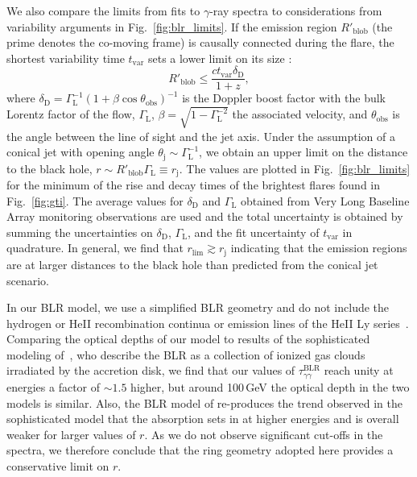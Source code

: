 \documentclass[twocolumn,linenumbers]{aastex62}
\newcommand{\gray}{$\gamma$-ray\xspace}
\begin{document}
We also compare the limits from fits to \gray spectra to considerations from variability arguments in Fig.~\ref{fig:blr_limits}.
If the emission region $R'_\mathrm{blob}$ (the prime denotes the co-moving frame) is causally connected during the flare, the shortest variability time $t_\mathrm{var}$ sets a lower limit on its size \citep[e.g.,][]{2008MNRAS.384L..19B}:
\begin{equation}
    R'_\mathrm{blob} \leqslant \frac{ct_\mathrm{var}\delta_\mathrm{D}}{1+z},  
\end{equation}
where $\delta_\mathrm{D} = \Gamma^{-1}_\mathrm{L}(1 + \beta\cos\theta_\mathrm{obs})^{-1}$ is the Doppler boost factor with the bulk Lorentz factor of the flow, $\Gamma_\mathrm{L}$, $\beta = \sqrt{1 - \Gamma_\mathrm{L}^{-2}}$ the associated velocity, and $\theta_\mathrm{obs} $ is the angle between the line of sight and the jet axis.
Under the assumption of a conical jet with opening angle $\theta_\mathrm{j} \sim \Gamma^{-1}_\mathrm{L}$, we obtain an upper limit on the distance to the black hole, $r \sim R'_\mathrm{blob}\Gamma_\mathrm{L} \equiv r_\mathrm{j}$.
The values are plotted in Fig.~\ref{fig:blr_limits} for the minimum of the rise and decay times of the brightest flares found in Fig.~\ref{fig:gti}.
The average values for $\delta_\mathrm{D}$ and $\Gamma_\mathrm{L}$ obtained from Very Long Baseline Array monitoring observations are used \citep[see also Tab.~\ref{tab:src-select}]{2017ApJ...846...98J}  and the total  uncertainty is obtained by summing the uncertainties on $\delta_\mathrm{D}$, $\Gamma_\mathrm{L}$, and the fit uncertainty of $t_\mathrm{var}$ in quadrature.
In general, we find that $r_\mathrm{lim} \gtrsim r_\mathrm{j}$ indicating that the emission regions are at larger distances to the black hole than predicted from the conical jet scenario.  

In our BLR model, we use a simplified BLR geometry and do not include the hydrogen or HeII recombination continua or emission lines of the HeII Ly series~\citep[as done in, e.g.,][]{2010ApJ...717L.118P,2014ApJ...794....8S}. 
Comparing the optical depths of our model to results of the sophisticated modeling of~\citet[see in particular their Fig.~11]{2017MNRAS.464..152A}, who describe the BLR as a collection of ionized gas clouds irradiated by the accretion disk, we find that our values of $\tau_{\gamma\gamma}^\mathrm{BLR}$ reach unity at energies a factor of $\sim1.5$ higher, but around 100\,GeV the optical depth in the two models is similar. 
Also, the BLR model of \citet{finke2016} re-produces the trend observed in the sophisticated model that the absorption sets in at higher energies and is overall weaker for larger values of $r$. 
As we do not observe significant cut-offs in the spectra, we therefore conclude that the ring geometry adopted here provides a conservative limit on $r$. 
\end{document}
